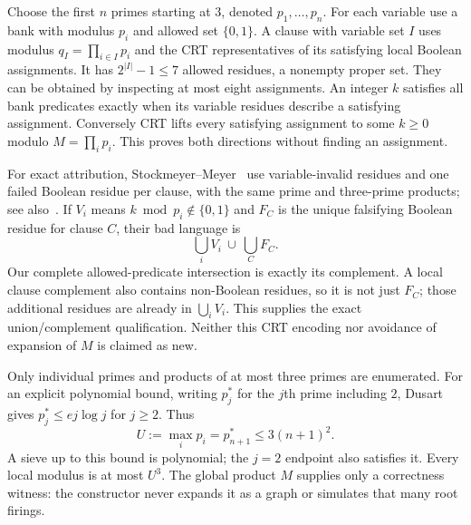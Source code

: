 \documentclass[11pt]{article}
\begin{document}
Choose the first $n$ primes starting at $3$, denoted $p_1,\ldots,p_n$.
For each variable use a bank with modulus $p_i$ and allowed set $\{0,1\}$.
A clause with variable set $I$ uses modulus $q_I=\prod_{i\in I}p_i$ and the
CRT representatives of its satisfying local Boolean assignments. It has
$2^{|I|}-1\le7$ allowed residues, a nonempty proper set. They can be obtained
by inspecting at most eight assignments. An integer $k$ satisfies all bank
predicates exactly when its variable residues describe a satisfying assignment.
Conversely CRT lifts every satisfying assignment to some $k\ge0$ modulo
$M=\prod_i p_i$. This proves both directions without finding an assignment.

For exact attribution, Stockmeyer--Meyer~\cite[Theorem~6.1, pp.~7--8]{SM}
use variable-invalid residues and one failed Boolean residue per clause, with
the same prime and three-prime products; see also~\cite[Fact~3]{Gramlich}.
If $V_i$ means $k\bmod p_i\notin\{0,1\}$ and $F_C$ is the unique falsifying
Boolean residue for clause $C$, their bad language is
\[
 \bigcup_i V_i\ \cup\ \bigcup_C F_C.
\]
Our complete allowed-predicate intersection is exactly its complement. A
local clause complement also contains non-Boolean residues, so it is not
just $F_C$; those additional residues are already in $\bigcup_i V_i$.
This supplies the exact union/complement qualification. Neither this CRT
encoding nor avoidance of expansion of $M$ is claimed as new.

Only individual primes and products of at most three primes are enumerated.
For an explicit polynomial bound, writing $p_j^*$ for the $j$th prime including
$2$, Dusart~\cite[Eq.~(4.2)]{Dusart} gives
$p_j^*\le e j\log j$ for $j\ge2$. Thus
\[
 U:=\max_i p_i=p_{n+1}^*\le3(n+1)^2.
\]
A sieve up to this bound is polynomial; the $j=2$ endpoint also satisfies it.
Every local modulus is at most $U^3$. The global product $M$ supplies only a
correctness witness: the constructor never expands it as a graph or simulates
that many root firings.
\end{document}
